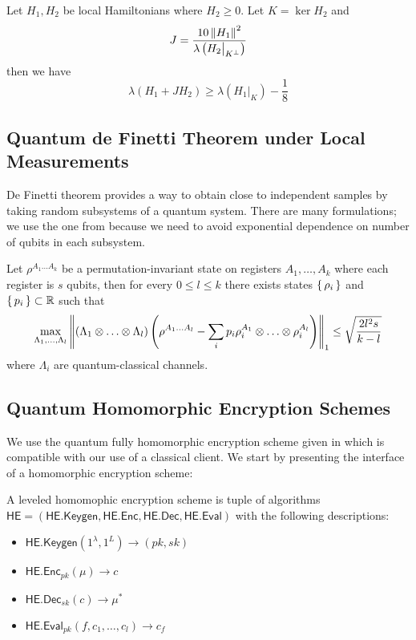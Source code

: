 
\begin{thm}
	\label{thm:projection}
	Let $H_1, H_2$ be local Hamiltonians where $H_2\geq0$. Let $K=\ker H_2$ and
	$$J=\frac{10\left\lVert H_1\right\rVert^2}{\lambda\left(H_2\big|_{K^\bot}\right)}$$
	then we have
	$$\lambda(H_1+JH_2)\geq\lambda\left(H_1\big|_K\right)-\frac{1}{8}$$
\end{thm}

\subsection{Quantum de Finetti Theorem under Local Measurements}

De Finetti theorem provides a way to obtain close to independent samples by taking random subsystems of a quantum system.
There are many formulations; we use the one from \cite{Brandão2017} because we need to avoid exponential dependence on number of qubits in each subsystem.
\begin{thm}
	\label{deFinetti}
	Let $\rho^{A_1\ldots A_k}$ be a permutation-invariant state on registers $A_1,\ldots,A_k$ where each register is $s$ qubits,
	then for every $0\leq l\leq k$ there exists states $\set{\rho_i}$ and $\set{p_i}\subset\mathbb{R}$ such that
	$$\max_{\Lambda_1,\ldots,\Lambda_l}
	\left\lVert(\Lambda_1\otimes\ldots\otimes\Lambda_l)\left(\rho^{A_1\ldots A_l}-\sum_ip_i\rho_i^{A_1}\otimes\ldots\otimes\rho_i^{A_l}\right)\right\rVert_1
	\leq\sqrt{\frac{2l^2s}{k-l}}$$
	where $\Lambda_i$ are quantum-classical channels.
\end{thm}

\subsection{Quantum Homomorphic Encryption Schemes}


\def\QHE{\mathsf{QHE}}
\def\QGen{\mathsf{QHE.Keygen}}
\def\QEnc{\mathsf{QHE.Enc}}
\def\QEval{\mathsf{QHE.Eval}}
\def\QDec{\mathsf{QHE.Dec}}

We use the quantum fully homomorphic encryption scheme given in \cite{mahadev_qfhe} which is compatible with our use of a classical client. We start by presenting the interface of a homomorphic encryption scheme:
\begin{definition}
	A leveled homomophic encryption scheme is tuple of algorithms \linebreak $\mathsf{HE}=(\mathsf{HE.Keygen}, \mathsf{HE.Enc}, \mathsf{HE.Dec}, \mathsf{HE.Eval})$ with the following descriptions:
	\begin{itemize}
		\item $\mathsf{HE.Keygen}(1^\lambda, 1^L)\rightarrow(pk, sk)$
		\item $\mathsf{HE.Enc}_{pk}(\mu)\rightarrow c$
		\item $\mathsf{HE.Dec}_{sk}(c)\rightarrow \mu^*$
		\item $\mathsf{HE.Eval}_{pk}(f, c_1, \ldots, c_l)\rightarrow c_f$
	\end{itemize}
\end{definition}

